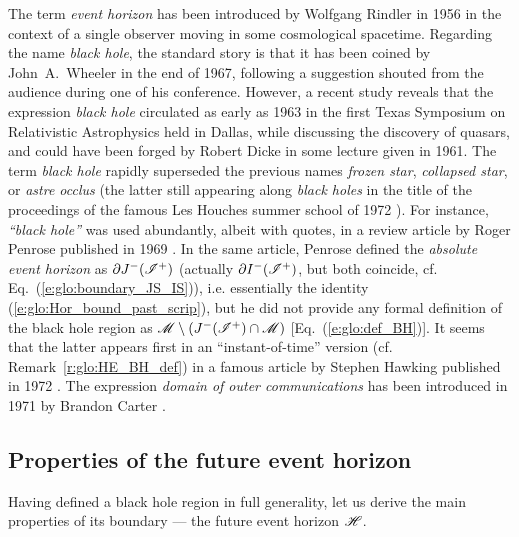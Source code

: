 \begin{hist} \label{h:glo:black_hole_name}
The term \emph{event horizon} has been introduced by Wolfgang Rindler in 1956 \cite{Rindl56}
in the context of a single observer moving in some cosmological spacetime.
Regarding the name \emph{black hole}, the standard
story is that it has been coined by John~A.~Wheeler in the end of 1967,
following a suggestion shouted from the audience during one of his conference.
However, a recent study \cite{HerdeL18} reveals that the expression \emph{black hole}
circulated as early as 1963 in the first Texas Symposium on Relativistic Astrophysics
held in Dallas,
while discussing the discovery of quasars, and could have been forged by
Robert Dicke in some lecture given in 1961.
The term \emph{black hole} rapidly superseded the previous names
\emph{frozen star}, \emph{collapsed star}, or \emph{astre occlus}
(the latter still appearing along \emph{black holes} in the title of
the proceedings of the famous Les Houches summer school of 1972 \cite{DeWit73}).
For instance, \emph{``black hole''} was used abundantly, albeit with
quotes, in a review article by Roger Penrose published
in 1969 \cite{Penro69}. In the same article, Penrose defined the \emph{absolute event horizon}
as $\partial J^-(\mathscr{I}^+)$ (actually $\partial I^-(\mathscr{I}^+)$, but both coincide, cf.
Eq.~(\ref{e:glo:boundary_JS_IS})), i.e. essentially the identity (\ref{e:glo:Hor_bound_past_scrip}), but he did not provide any formal definition of the
black hole region as $ \mathscr{M} \setminus (J^-(\mathscr{I}^+)\cap\mathscr{M})$ [Eq.~(\ref{e:glo:def_BH})].
It seems that the latter appears first in an ``instant-of-time'' version
(cf. Remark~\ref{r:glo:HE_BH_def}) in a famous article by Stephen Hawking published in 1972 \cite{Hawki72}.
The expression \emph{domain of outer communications} has been introduced in 1971 by
Brandon Carter \cite{Carte71}.
\end{hist}


\subsection{Properties of the future event horizon} \label{s:glo:properties_H}

Having defined a black hole region in full generality, let us derive the
main properties of its boundary --- the future event horizon $\mathscr{H}$.


